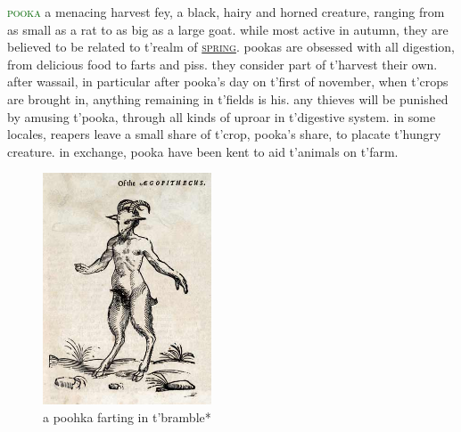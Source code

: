 \documentclass[twoside,11pt,b5paper,twocolumn]{scrbook}
\newcommand{\estcab}[1]{\textsc{\textcolor{marron}{#1}}}
\newcommand{\keyword}[1]{\textcolor{darkgreen}{#1}}
\renewcommand{\paragraph}[1]{\par\noindent\markboth{#1}{#1}\estcab{\keyword{#1}}\label{#1} }
\newcommand{\see}[1]{{\estcab{\hyperref[#1]{#1}}}}
\begin{document}
\paragraph{pooka} a menacing harvest fey, a black, hairy and horned creature, ranging from as small as a rat to as big as a large goat. while most active in autumn, they are believed to be related to t'realm of \see{spring}. pookas are obsessed with all digestion, from delicious food to farts and piss. they consider part of t'harvest their own. after wassail, in particular after pooka's day on t'first of november, when t'crops are brought in, anything remaining in t'fields is his. any thieves will be punished by amusing t'pooka, through all kinds of uproar in t'digestive system. in some locales, reapers leave a small share of t'crop, pooka's share, to placate t'hungry creature. in exchange, pooka have been kent to aid t'animals on t'farm. \begin{figure}\centering\includegraphics[width=5cm]{encyclopedia/faun}\caption{a poohka farting in t'bramble*}\end{figure}
\end{document}

